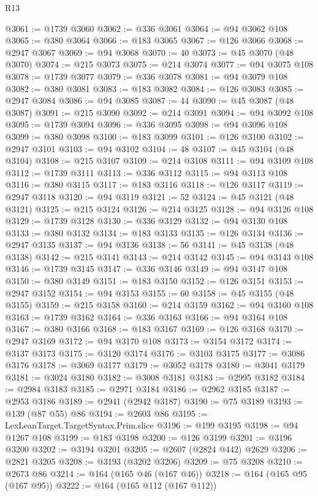 \begin{lexlean}{R13}
\begin{coremodule}
@3061 := @1739 @3060
@3062 := @336 @3061
@3064 := @94 @3062 @108
@3065 := @380 @3064
@3066 := @183 @3065
@3067 := @126 @3066
@3068 := @2947 @3067
@3069 := @94 @3068
@3070 := 40
@3073 := @45 @3070 (@48 @3070)
@3074 := @215 @3073
@3075 := @214 @3074
@3077 := @94 @3075 @108
@3078 := @1739 @3077
@3079 := @336 @3078
@3081 := @94 @3079 @108
@3082 := @380 @3081
@3083 := @183 @3082
@3084 := @126 @3083
@3085 := @2947 @3084
@3086 := @94 @3085
@3087 := 44
@3090 := @45 @3087 (@48 @3087)
@3091 := @215 @3090
@3092 := @214 @3091
@3094 := @94 @3092 @108
@3095 := @1739 @3094
@3096 := @336 @3095
@3098 := @94 @3096 @108
@3099 := @380 @3098
@3100 := @183 @3099
@3101 := @126 @3100
@3102 := @2947 @3101
@3103 := @94 @3102
@3104 := 48
@3107 := @45 @3104 (@48 @3104)
@3108 := @215 @3107
@3109 := @214 @3108
@3111 := @94 @3109 @108
@3112 := @1739 @3111
@3113 := @336 @3112
@3115 := @94 @3113 @108
@3116 := @380 @3115
@3117 := @183 @3116
@3118 := @126 @3117
@3119 := @2947 @3118
@3120 := @94 @3119
@3121 := 52
@3124 := @45 @3121 (@48 @3121)
@3125 := @215 @3124
@3126 := @214 @3125
@3128 := @94 @3126 @108
@3129 := @1739 @3128
@3130 := @336 @3129
@3132 := @94 @3130 @108
@3133 := @380 @3132
@3134 := @183 @3133
@3135 := @126 @3134
@3136 := @2947 @3135
@3137 := @94 @3136
@3138 := 56
@3141 := @45 @3138 (@48 @3138)
@3142 := @215 @3141
@3143 := @214 @3142
@3145 := @94 @3143 @108
@3146 := @1739 @3145
@3147 := @336 @3146
@3149 := @94 @3147 @108
@3150 := @380 @3149
@3151 := @183 @3150
@3152 := @126 @3151
@3153 := @2947 @3152
@3154 := @94 @3153
@3155 := 60
@3158 := @45 @3155 (@48 @3155)
@3159 := @215 @3158
@3160 := @214 @3159
@3162 := @94 @3160 @108
@3163 := @1739 @3162
@3164 := @336 @3163
@3166 := @94 @3164 @108
@3167 := @380 @3166
@3168 := @183 @3167
@3169 := @126 @3168
@3170 := @2947 @3169
@3172 := @94 @3170 @108
@3173 := @3154 @3172
@3174 := @3137 @3173
@3175 := @3120 @3174
@3176 := @3103 @3175
@3177 := @3086 @3176
@3178 := @3069 @3177
@3179 := @3052 @3178
@3180 := @3041 @3179
@3181 := @3024 @3180
@3182 := @3008 @3181
@3183 := @2995 @3182
@3184 := @2984 @3183
@3185 := @2971 @3184
@3186 := @2962 @3185
@3187 := @2953 @3186
@3189 := @2941 (@2942 @3187)
@3190 := @75 @3189
@3193 := @139 (@87 @55) @86
@3194 := @2603 @86
@3195 := LexLeanTarget.TargetSyntax.Prim.slice
@3196 := @199 @3195
@3198 := @94 @1267 @108
@3199 := @183 @3198
@3200 := @126 @3199
@3201 := @3196 @3200
@3202 := @3194 @3201
@3205 := @2607 (@2824 @442) @2629
@3206 := @2821 @3205
@3208 := @3193 (@3202 @3206)
@3209 := @75 @3208
@3210 := @2673 @86
@3214 := @164 (@165 @46 (@167 @46))
@3218 := @164 (@165 @95 (@167 @95))
@3222 := @164 (@165 @112 (@167 @112))

\end{coremodule}
\end{lexlean}
